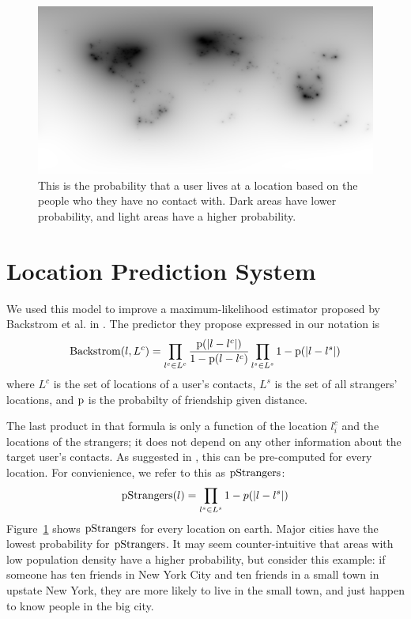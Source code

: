 \begin{figure}[tbh]
\centering
\includegraphics[width=\linewidth]{figures/stranger_mat.png}
\caption{
    This is the probability that a user lives at a location based on the people
    who they have no contact with. Dark areas have lower probability, and light
    areas have a higher probability.
}
\label{fig:StrangerMat}
\end{figure}


\section{Location Prediction System}
We used this model to improve a maximum-likelihood estimator proposed by
Backstrom et al. in \cite{backstrom2010find}.
%
The predictor they propose expressed in our notation is
\[
    \operatorname{Backstrom}(l,L^c) = 
        \prod_{l^c \in L^c} {\operatorname{p}(|l-l^c|) \over 1-\operatorname{p}(l-l^c) }
        \prod_{l^s \in L^s} 1-\operatorname{p}(|l-l^s|)
\]
where $L^c$ is the set of locations of a user's contacts, $L^s$ is the set
of all strangers' locations, and $\operatorname{p}$ is the probabilty of friendship given
distance.

The last product in that formula is only a function of the location $l^c_i$ and
the locations of the strangers; it does not depend on any other information
about the target user's contacts.
%
As suggested in \cite{backstrom2010find}, this can be pre-computed for every
location.
%
For convienience, we refer to this as $\operatorname{pStrangers}$:
\[
    \operatorname{pStrangers}(l) = \prod_{l^s \in L^s}1-p(|l-l^s|)
\]
Figure~\ref{fig:StrangerMat} shows $\operatorname{pStrangers}$ for every location on earth.
%
%
Major cities have the lowest probability for $\operatorname{pStrangers}$.
%
It may seem counter-intuitive that areas with low population density have a
higher probability, but consider this example: if someone has ten friends in
New York City and ten friends in a small town in upstate New York, they are
more likely to live in the small town, and just happen to know people in the
big city.

